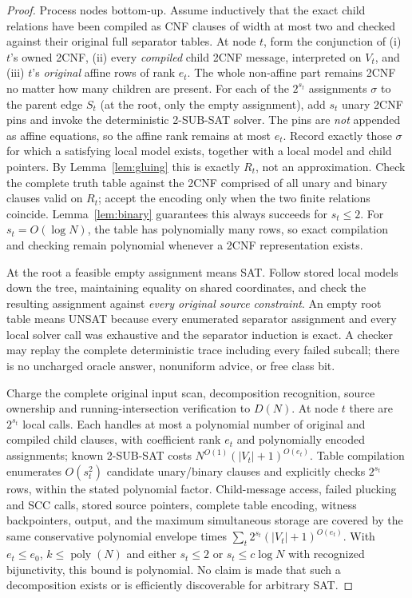 \documentclass[11pt]{article}
\begin{document}
\begin{proof}
Process nodes bottom-up.  Assume inductively that the exact child relations have been compiled as CNF clauses of width at most two and checked against their original full separator tables.  At node $t$, form the conjunction of (i) $t$'s owned 2CNF, (ii) every \emph{compiled} child 2CNF message, interpreted on $V_t$, and (iii) $t$'s \emph{original} affine rows of rank $e_t$.  The whole non-affine part remains 2CNF no matter how many children are present.  For each of the $2^{s_t}$ assignments $\sigma$ to the parent edge $S_t$ (at the root, only the empty assignment), add $s_t$ unary 2CNF pins and invoke the deterministic 2-SUB-SAT solver.  The pins are \emph{not} appended as affine equations, so the affine rank remains at most $e_t$.  Record exactly those $\sigma$ for which a satisfying local model exists, together with a local model and child pointers.  By Lemma~\ref{lem:gluing} this is exactly $R_t$, not an approximation.  Check the complete truth table against the 2CNF comprised of all unary and binary clauses valid on $R_t$; accept the encoding only when the two finite relations coincide.  Lemma~\ref{lem:binary} guarantees this always succeeds for $s_t\le2$.  For $s_t=O(\log N)$, the table has polynomially many rows, so exact compilation and checking remain polynomial whenever a 2CNF representation exists.

At the root a feasible empty assignment means SAT.  Follow stored local models down the tree, maintaining equality on shared coordinates, and check the resulting assignment against \emph{every original source constraint}.  An empty root table means UNSAT because every enumerated separator assignment and every local solver call was exhaustive and the separator induction is exact.  A checker may replay the complete deterministic trace including every failed subcall; there is no uncharged oracle answer, nonuniform advice, or free class bit.

Charge the complete original input scan, decomposition recognition, source ownership and running-intersection verification to $D(N)$.  At node $t$ there are $2^{s_t}$ local calls.  Each handles at most a polynomial number of original and compiled child clauses, with coefficient rank $e_t$ and polynomially encoded assignments; known 2-SUB-SAT costs $N^{O(1)}(|V_t|+1)^{O(e_t)}$.  Table compilation enumerates $O(s_t^2)$ candidate unary/binary clauses and explicitly checks $2^{s_t}$ rows, within the stated polynomial factor.  Child-message access, failed plucking and SCC calls, stored source pointers, complete table encoding, witness backpointers, output, and the maximum simultaneous storage are covered by the same conservative polynomial envelope times $\sum_t2^{s_t} (|V_t|+1)^{O(e_t)}$.  With $e_t\le e_0$, $k\le\operatorname{poly}(N)$ and either $s_t\le2$ or $s_t\le c\log N$ with recognized bijunctivity, this bound is polynomial.  No claim is made that such a decomposition exists or is efficiently discoverable for arbitrary SAT.
\end{proof}
\end{document}
